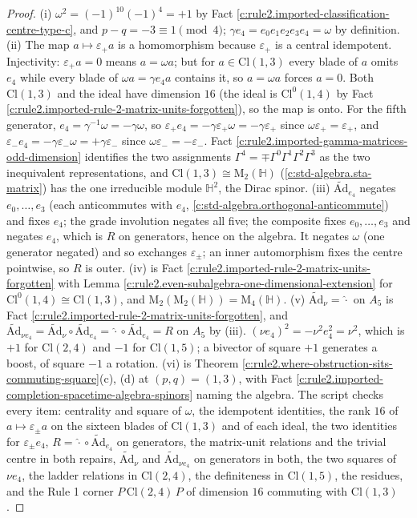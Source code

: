 \documentclass[11pt]{article}
\theoremstyle{definition}
\theoremstyle{plain}
\providecommand{\Ad}{}\renewcommand{\Ad}{\widetilde{\mathrm{Ad}}}
\providecommand{\Cl}{}\renewcommand{\Cl}{\mathrm{Cl}}
\providecommand{\HH}{}\renewcommand{\HH}{\mathbb{H}}
\providecommand{\Mat}{}\renewcommand{\Mat}{\mathrm{M}}
\begin{document}
\begin{proof}
(i) $\omega^2 = (-1)^{10}(-1)^4 = +1$ by Fact \ref{c:rule2.imported-classification-centre-type-c}, and $p - q = -3 \equiv 1 \pmod 4$; $\gamma e_4 = e_0e_1e_2e_3e_4 = \omega$ by definition. (ii) The map $a \mapsto \varepsilon_+ a$ is a homomorphism because $\varepsilon_+$ is a central idempotent. Injectivity: $\varepsilon_+ a = 0$ means $a = \omega a$; but for $a \in \Cl(1,3)$ every blade of $a$ omits $e_4$ while every blade of $\omega a = \gamma e_4 a$ contains it, so $a = \omega a$ forces $a = 0$. Both $\Cl(1,3)$ and the ideal have dimension $16$ (the ideal is $\Cl^0(1,4)$ by Fact \ref{c:rule2.imported-rule-2-matrix-units-forgotten}), so the map is onto. For the fifth generator, $e_4 = \gamma^{-1}\omega = -\gamma\omega$, so $\varepsilon_+ e_4 = -\gamma\varepsilon_+\omega = -\gamma\varepsilon_+$ since $\omega\varepsilon_+ = \varepsilon_+$, and $\varepsilon_- e_4 = -\gamma\varepsilon_-\omega = +\gamma\varepsilon_-$ since $\omega\varepsilon_- = -\varepsilon_-$. Fact \ref{c:rule2.imported-gamma-matrices-odd-dimension} identifies the two assignments $\Gamma^4 = \mp\Gamma^0\Gamma^1\Gamma^2\Gamma^3$ as the two inequivalent representations, and $\Cl(1,3) \cong \Mat_2(\HH)$ (\ref{c:std-algebra.sta-matrix}) has the one irreducible module $\HH^2$, the Dirac spinor. (iii) $\Ad_{e_4}$ negates $e_0, \ldots, e_3$ (each anticommutes with $e_4$, \ref{c:std-algebra.orthogonal-anticommute}) and fixes $e_4$; the grade involution negates all five; the composite fixes $e_0, \ldots, e_3$ and negates $e_4$, which is $R$ on generators, hence on the algebra. It negates $\omega$ (one generator negated) and so exchanges $\varepsilon_\pm$; an inner automorphism fixes the centre pointwise, so $R$ is outer. (iv) is Fact \ref{c:rule2.imported-rule-2-matrix-units-forgotten} with Lemma \ref{c:rule2.even-subalgebra-one-dimensional-extension} for $\Cl^0(1,4) \cong \Cl(1,3)$, and $\Mat_2(\Mat_2(\HH)) = \Mat_4(\HH)$. (v) $\Ad_\nu = \hat{\cdot}$ on $A_5$ is Fact \ref{c:rule2.imported-rule-2-matrix-units-forgotten}, and $\Ad_{\nu e_4} = \Ad_\nu \circ \Ad_{e_4} = \hat{\cdot} \circ \Ad_{e_4} = R$ on $A_5$ by (iii). $(\nu e_4)^2 = -\nu^2 e_4^2 = \nu^2$, which is $+1$ for $\Cl(2,4)$ and $-1$ for $\Cl(1,5)$; a bivector of square $+1$ generates a boost, of square $-1$ a rotation. (vi) is Theorem \ref{c:rule2.where-obstruction-sits-commuting-square}(c), (d) at $(p,q) = (1,3)$, with Fact \ref{c:rule2.imported-completion-spacetime-algebra-spinors} naming the algebra. The script checks every item: centrality and square of $\omega$, the idempotent identities, the rank $16$ of $a \mapsto \varepsilon_\pm a$ on the sixteen blades of $\Cl(1,3)$ and of each ideal, the two identities for $\varepsilon_\pm e_4$, $R = \hat{\cdot} \circ \Ad_{e_4}$ on generators, the matrix-unit relations and the trivial centre in both repairs, $\Ad_\nu$ and $\Ad_{\nu e_4}$ on generators in both, the two squares of $\nu e_4$, the ladder relations in $\Cl(2,4)$, the definiteness in $\Cl(1,5)$, the residues, and the Rule 1 corner $P\,\Cl(2,4)\,P$ of dimension $16$ commuting with $\Cl(1,3)$.

\end{proof}
\end{document}
